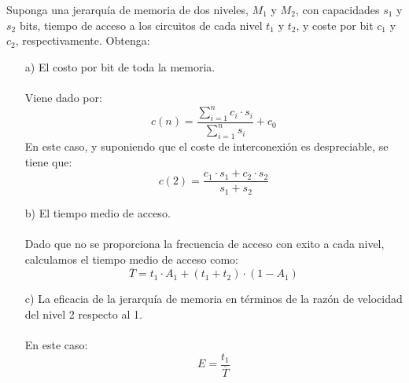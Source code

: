 \setcounter{section}{0}
\begin{ejercicio}
    Suponga una jerarquía de memoria de dos niveles, \( M_1 \) y \( M_2 \), con capacidades \( s_1 \) y \( s_2 \) bits, tiempo de acceso a los circuitos de cada nivel \( t_1 \) y \( t_2 \), y coste por bit \( c_1 \) y \( c_2 \), respectivamente. Obtenga:
    \begin{itemize}
        \item[a)] El costo por bit de toda la memoria.\\ \\
            Viene dado por:
            \begin{equation*}
                c(n) = \frac{\sum_{i=1}^{n} c_i \cdot s_i}{\sum_{i=1}^{n} s_i} + c_0
            \end{equation*}
            En este caso, y suponiendo que el coste de interconexión es despreciable, se tiene que:
            \begin{equation*}
                c(2) = \frac{c_1 \cdot s_1 + c_2 \cdot s_2}{s_1 + s_2}
            \end{equation*}
        \item[b)] El tiempo medio de acceso.
            \\ \\
            Dado que no se proporciona la frecuencia de acceso con exito a cada nivel, calculamos el tiempo medio de acceso como:
            \begin{equation*}
                \overline{T} = t_1 \cdot A_1 + (t_1 + t_2) \cdot (1 - A_1)
            \end{equation*}

        \item[c)] La eficacia de la jerarquía de memoria en términos de la razón de velocidad del nivel 2 respecto al 1. \\ \\
            En este caso:
            \begin{equation*}
                E = \frac{t_1}{\overline{T}}
            \end{equation*}
    \end{itemize}
\end{ejercicio}


